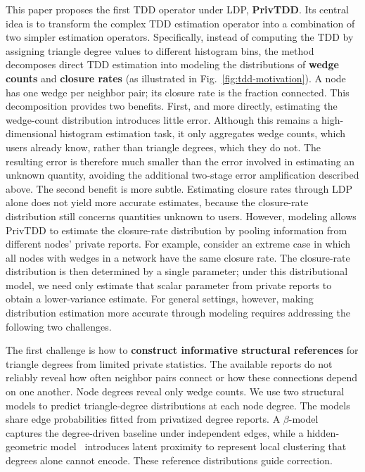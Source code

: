 This paper proposes the first TDD operator under LDP, \textbf{PrivTDD}.
Its central idea is to transform the complex TDD estimation operator into a combination of two simpler estimation operators.
Specifically, instead of computing the TDD by assigning triangle degree values to different histogram bins, the method decomposes direct TDD estimation into modeling the distributions of \textbf{wedge counts} and \textbf{closure rates} (as illustrated in Fig.~\ref{fig:tdd-motivation}).
A node has one wedge per neighbor pair; its closure rate is the fraction connected. This decomposition provides two benefits.
First, and more directly, estimating the wedge-count distribution introduces little error.
Although this remains a high-dimensional histogram estimation task, it only aggregates wedge counts, which users already know, rather than triangle degrees, which they do not.
The resulting error is therefore much smaller than the error involved in estimating an unknown quantity, avoiding the additional two-stage error amplification described above.
The second benefit is more subtle.
Estimating closure rates through LDP alone does not yield more accurate estimates, because the closure-rate distribution still concerns quantities unknown to users.
However, modeling allows PrivTDD to estimate the closure-rate distribution by pooling information from different nodes' private reports.
For example, consider an extreme case in which all nodes with wedges in a network have the same closure rate.
The closure-rate distribution is then determined by a single parameter; under this distributional model, we need only estimate that scalar parameter from private reports to obtain a lower-variance estimate.
For general settings, however, making distribution estimation more accurate through modeling requires addressing the following two challenges.

The first challenge is how to \textbf{construct informative structural references} for triangle degrees from limited private statistics.
The available reports do not reliably reveal how often neighbor pairs connect or how these connections depend on one another. Node degrees reveal only wedge counts.
We use two structural models to predict triangle-degree distributions at each node degree. The models share edge probabilities fitted from privatized degree reports.
A $\beta$-model~\cite{chatterjee2011random} captures the degree-driven baseline under independent edges, while a hidden-geometric model~\cite{serrano2008selfsimilarity} introduces latent proximity to represent local clustering that degrees alone cannot encode. 
These reference distributions guide correction.

